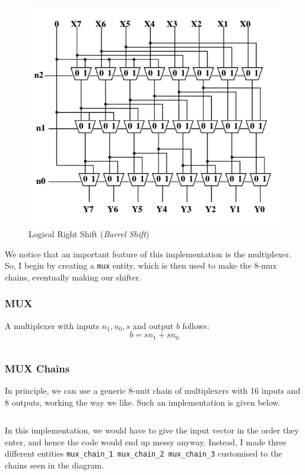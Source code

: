 \documentclass[a4paper, 11pt]{article}
\begin{document}
\begin{figure}[h]
\centering
\includegraphics[scale=0.6]{barrel_right}
\caption{Logical Right Shift (\emph{Barrel Shift})}
\end{figure}
We notice that an important feature of this implementation is the multiplexer. So, I begin by creating a \texttt{mux} entity, which is then used to make the 8-mux chains, eventually making our shifter.

\subsubsection*{MUX}
A multiplexer with inputs $n_1,n_0,s$ and output $b$ follows:
$$
b = s n_1 + \overline{s}n_0
$$
\inputminted[linenos]{vhdl}{ALU_exp/mux.vhd}

\subsubsection*{MUX Chains}
In principle, we can use a generic 8-unit chain of multiplexers with 16 inputs and 8 outputs, working the way we like. Such an implementation is given below.

\inputminted[linenos]{vhdl}{ALU_exp/mux8.vhd}

In this implementation, we would have to give the input vector in the order they enter, and hence the code would end up messy anyway. Instead, I made three different entities \texttt{mux\_chain\_1  mux\_chain\_2  mux\_chain\_3} customised to the chains seen in the diagram.\\
\end{document}
